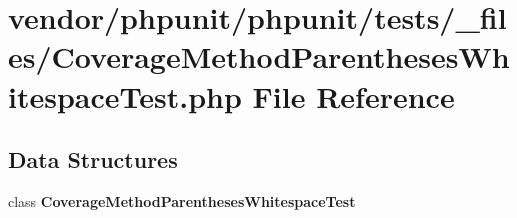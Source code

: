 \section{vendor/phpunit/phpunit/tests/\+\_\+files/\+Coverage\+Method\+Parentheses\+Whitespace\+Test.php File Reference}
\label{phpunit_2tests_2__files_2_coverage_method_parentheses_whitespace_test_8php}
\subsection*{Data Structures}
\begin{DoxyCompactItemize}
\item 
class {\bf Coverage\+Method\+Parentheses\+Whitespace\+Test}
\end{DoxyCompactItemize}
